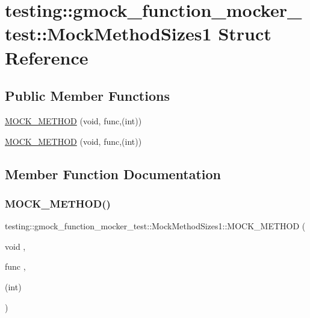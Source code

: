 \hypertarget{structtesting_1_1gmock__function__mocker__test_1_1_mock_method_sizes1}{}\section{testing\+::gmock\+\_\+function\+\_\+mocker\+\_\+test\+::Mock\+Method\+Sizes1 Struct Reference}
\label{structtesting_1_1gmock__function__mocker__test_1_1_mock_method_sizes1}
\subsection*{Public Member Functions}
\begin{DoxyCompactItemize}
\item 
\mbox{\hyperlink{structtesting_1_1gmock__function__mocker__test_1_1_mock_method_sizes1_af4255cca5805a41a3604efcda13a1a86}{M\+O\+C\+K\+\_\+\+M\+E\+T\+H\+OD}} (void, func,(int))
\item 
\mbox{\hyperlink{structtesting_1_1gmock__function__mocker__test_1_1_mock_method_sizes1_af4255cca5805a41a3604efcda13a1a86}{M\+O\+C\+K\+\_\+\+M\+E\+T\+H\+OD}} (void, func,(int))
\end{DoxyCompactItemize}


\subsection{Member Function Documentation}
\mbox{\label{structtesting_1_1gmock__function__mocker__test_1_1_mock_method_sizes1_af4255cca5805a41a3604efcda13a1a86}} 
\subsubsection{\texorpdfstring{MOCK\_METHOD()}{MOCK\_METHOD()}\hspace{0.1cm}{\footnotesize\ttfamily [1/2]}}
{\footnotesize\ttfamily testing\+::gmock\+\_\+function\+\_\+mocker\+\_\+test\+::\+Mock\+Method\+Sizes1\+::\+M\+O\+C\+K\+\_\+\+M\+E\+T\+H\+OD (\begin{DoxyParamCaption}\item[{void}]{,  }\item[{func}]{,  }\item[{(int)}]{ }\end{DoxyParamCaption})}

